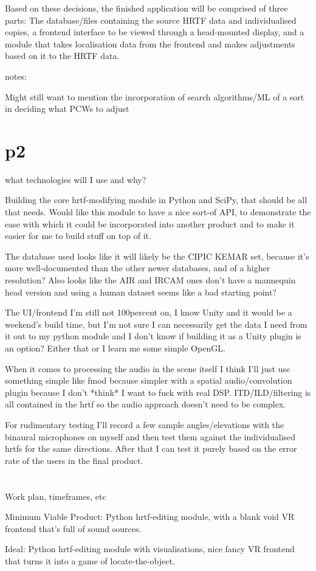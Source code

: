 \documentclass[10pt, oneside, a4paper, draft]{scrartcl}
\begin{document}
Based on these decisions, the finished application will be comprised of three parts: The database/files containing the source HRTF data and individualised copies, a frontend interface to be viewed through a head-mounted display, and a module that takes localisation data from the frontend and makes adjustments based on it to the HRTF data. 

notes: 

Might still want to mention the incorporation of search algorithms/ML of a sort in deciding what PCWs to adjust

\section*{p2}


what technologies will I use and why?

Building the core hrtf-modifying module in Python and SciPy, that should be all that needs. Would like this module to have a nice sort-of API, to demonstrate the ease with which it could be incorporated into another product and to make it easier for me to build stuff on top of it.   

The database used looks like it will likely be the CIPIC KEMAR set, because it's more well-documented than the other newer databases, and of a higher resolution? Also looks like the AIR and IRCAM ones don't have a mannequin head version and using a human dataset seems like a bad starting point?  

The UI/frontend I'm still not 100percent on, I know Unity and it would be a weekend's build time, but I'm not sure I can necessarily get the data I need from it out to my python module and I don't know if building it as a Unity plugin is an option? Either that or I learn me some simple OpenGL. 

When it comes to processing the audio in the scene itself I think I'll just use something simple like fmod because simpler with a spatial audio/convolution plugin because I don't *think* I want to fuck with real DSP. ITD/ILD/filtering is all contained in the hrtf so the audio approach doesn't need to be complex. 

For rudimentary testing I'll record a few sample angles/elevations with the binaural microphones on myself and then test them against the individualised hrtfs for the same directions. After that I can test it purely based on the error rate of the users in the final product. 

\section*{}
Work plan, timeframes, etc

Minimum Viable Product: 
Python hrtf-editing module, with a blank void VR frontend that's full of sound sources. 

Ideal:
Python hrtf-editing module with visualisations, nice fancy VR frontend that turns it into a game of locate-the-object.
\end{document}
